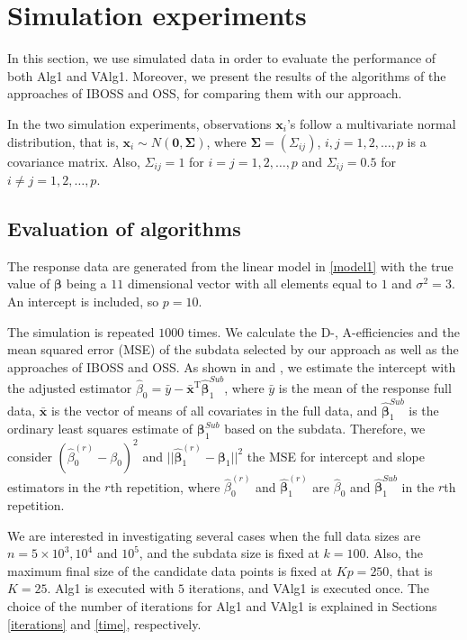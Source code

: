 \documentclass[12pt]{article}
\theoremstyle{definition}
\begin{document}
	\section{Simulation experiments}\label{section_simulation}
	In this section, we use simulated data in order to evaluate the performance of both Alg1 and VAlg1. Moreover, we present the results of the algorithms of the approaches of IBOSS and OSS, for comparing them with our approach.
	
	In the two simulation experiments, observations $\textbf{x}_i$'s follow a multivariate normal distribution, that is, $\textbf{x}_i\sim N(\textbf{0},\mathbf{\Sigma})$, where $\mathbf{\Sigma}=\left(\Sigma_{ij}\right)$, $i,j=1,2,\ldots,p$ is a covariance matrix. Also, $\Sigma_{ij}=1$ for $i=j=1,2,\ldots,p$ and $\Sigma_{ij}=0.5$ for $i\ne j=1,2,\ldots,p$.
	
	\subsection{Evaluation of algorithms}
	The response data are generated from the linear model in \eqref{model1} with the true value of $\boldsymbol{\beta}$ being a $11$ dimensional vector with all elements equal to $1$ and $\sigma^2=3$. An intercept is included, so $p=10$.
	
	The simulation is repeated $1000$ times. We calculate the D-, A-efficiencies and the mean squared error (MSE) of the subdata selected by our approach as well as the approaches of IBOSS and OSS. As shown in \cite{wang2019information} and \cite{wang2021oss}, we estimate the intercept with the adjusted estimator $\hat{\beta}_0=\bar{y}-\bar{\textbf{x}}^{\text{T}}\hat{\boldsymbol{\beta}}_1^{Sub}$, where $\bar{y}$ is the mean of the response full data, $\bar{\textbf{x}}$ is the vector of means of all covariates in the full data, and $\hat{\boldsymbol{\beta}}_1^{Sub}$ is the ordinary least squares estimate of $\boldsymbol{\beta}_1^{Sub}$ based on the subdata. Therefore, we consider $(\hat{\beta}_0^{(r)}-\beta_0)^2$ and $||\hat{\boldsymbol{\beta}}_1^{(r)}-\boldsymbol{\beta}_1||^2$ the MSE for intercept and slope estimators in the $r$th repetition, where $\hat{\beta}_0^{(r)}$ and $\hat{\boldsymbol{\beta}}_1^{(r)}$ are $\hat{\beta}_0$ and $\hat{\boldsymbol{\beta}}_1^{Sub}$ in the $r$th repetition.
	
	We are interested in investigating several cases when the full data sizes are $n=5\times10^3, 10^4$ and $10^5$, and the subdata size is fixed at $k=100$. Also, the maximum final size of the candidate data points is fixed at $Kp=250$, that is $K=25$. Alg1 is executed with $5$ iterations, and VAlg1 is executed once. The choice of the number of iterations for Alg1 and VAlg1 is explained in Sections \ref{iterations} and \ref{time}, respectively. 
	
\end{document}
